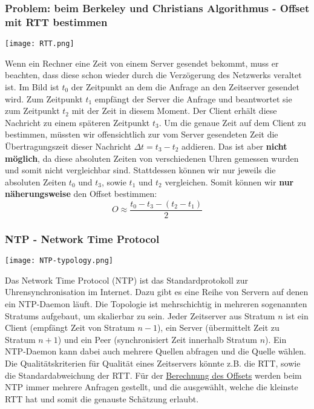 \subsubsection{Problem: beim Berkeley und Christian\textquotesingle s Algorithmus - Offset mit RTT bestimmen}
\label{sec:offset-with-rtt}

\texttt{[image: RTT.png]}

Wenn ein Rechner eine Zeit von einem Server gesendet bekommt, muss er beachten, dass diese schon wieder durch die Verzögerung des Netzwerks veraltet ist. Im Bild ist $t_{0}$ der Zeitpunkt an dem die Anfrage an den Zeitserver gesendet wird. Zum Zeitpunkt $t_{1}$ empfängt der Server die Anfrage und beantwortet sie zum Zeitpunkt $t_{2}$ mit der Zeit in diesem Moment. Der Client erhält diese Nachricht zu einem späteren Zeitpunkt $t_{3}$. Um die genaue Zeit auf dem Client zu bestimmen, müssten wir offensichtlich zur vom Server gesendeten Zeit die Übertragungszeit dieser Nachricht $\Delta t = t_{3} - t_{2}$ addieren. Das ist aber \textbf{nicht möglich}, da diese absoluten Zeiten von verschiedenen Uhren gemessen wurden und somit nicht vergleichbar sind. Stattdessen können wir nur jeweils die absoluten Zeiten $t_{0}$ und $t_{3}$, sowie $t_{1}$ und $t_{2}$ vergleichen. Somit können wir \textbf{nur näherungsweise} den Offset bestimmen:
\[
    O \approx \frac{t_{0} - t_{3} - (t_{2} - t_{1})}{2}
\]

\subsubsection{NTP - Network Time Protocol}

\vspace{5px}

\texttt{[image: NTP-typology.png]}

Das Network Time Protocol (NTP) ist das Standardprotokoll zur Uhrensynchronisation im Internet. Dazu gibt es eine Reihe von Servern auf denen ein NTP-Daemon läuft. Die Topologie ist mehrschichtig in mehreren sogenannten Stratums aufgebaut, um skalierbar zu sein. Jeder Zeitserver aus Stratum $n$ ist ein Client (empfängt Zeit von Stratum $n-1$), ein Server (übermittelt Zeit zu Stratum $n+1$) und ein Peer (synchronisiert Zeit innerhalb Stratum $n$). Ein NTP-Daemon kann dabei auch mehrere Quellen abfragen und die  Quelle wählen. Die Qualitätskriterien für Qualität eines Zeitservers könnte z.B. die RTT, sowie die Standardabweichung der RTT. Für der \hyperref[sec:offset-with-rtt]{Berechnung des Offsets} werden beim NTP immer mehrere Anfragen gestellt, und die ausgewählt, welche die kleinste RTT hat und somit die genauste Schätzung erlaubt.

